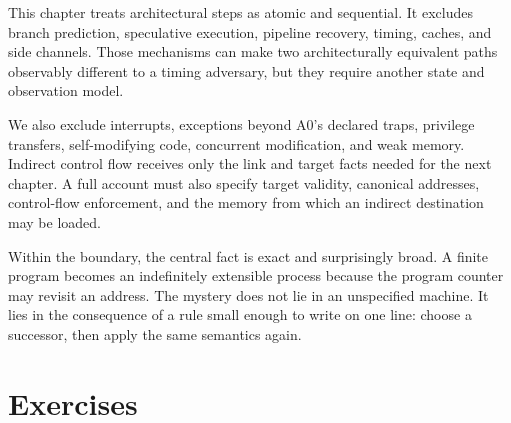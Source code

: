 This chapter treats architectural steps as atomic and sequential. It excludes
branch prediction, speculative execution, pipeline recovery, timing, caches,
and side channels. Those mechanisms can make two architecturally equivalent
paths observably different to a timing adversary, but they require another
state and observation model.

We also exclude interrupts, exceptions beyond A0's declared traps, privilege
transfers, self-modifying code, concurrent modification, and weak memory.
Indirect control flow receives only the link and target facts needed for the
next chapter. A full account must also specify target validity, canonical
addresses, control-flow enforcement, and the memory from which an indirect
destination may be loaded.

Within the boundary, the central fact is exact and surprisingly broad. A
finite program becomes an indefinitely extensible process because the program
counter may revisit an address. The mystery does not lie in an unspecified
machine. It lies in the consequence of a rule small enough to write on one
line: choose a successor, then apply the same semantics again.

\section{Exercises}

